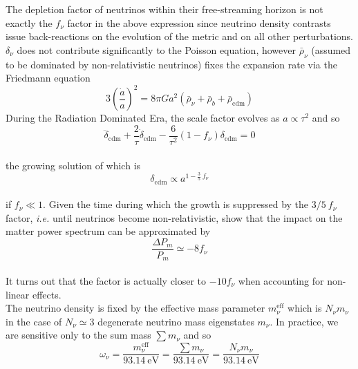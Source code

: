 The depletion factor of neutrinos within their free-streaming horizon is not exactly the $f_\nu$ factor in the above expression since neutrino density contrasts issue back-reactions on the evolution of the metric and on all other perturbations. $\delta_\nu$ does not contribute significantly to the Poisson equation, however $\bar{\rho}_\nu$ (assumed to be dominated by non-relativistic neutrinos) fixes the expansion rate via the Friedmann equation \\
\begin{equation}
3 \left( \frac{\dot{a}}{a} \right)^2 = 8 \pi G a^2 \left( \bar{\rho}_\nu + \bar{\rho}_b + \bar{\rho}_{\mathrm{cdm}} \right)
\end{equation} During the Radiation Dominated Era, the scale factor evolves as $a \propto \tau^2$ and so\\
\begin{equation}
\ddot{\delta}_{\mathrm{cdm}} + \frac{2}{\tau} \dot{\delta}_{\mathrm{cdm}} - \frac{6}{\tau^2} (1-f_\nu) \delta_{\mathrm{cdm}} = 0
\end{equation} \\ the growing solution of which is \\
\begin{equation}
\delta_{\mathrm{cdm}} \propto a^{1-\frac{3}{5}~f_\nu}
\end{equation} \\ if $f_\nu \ll 1$. Given the time during which the growth is suppressed by the $3/5~f_\nu$ factor, \textit{i.e.} until neutrinos become non-relativistic, \cite{LESGOURGUES2006} show that the impact on the matter power spectrum can be approximated by \\
\begin{equation}
\label{eq:tnu}
\frac{\Delta P_m}{P_m} \simeq - 8 f_\nu
\end{equation} \\ It turns out that the factor is actually closer to $- 10 f_{\nu}$ when accounting for non-linear effects. \\

The neutrino density is fixed by the effective mass parameter $m_\nu^{\mathrm{eff}}$ which is $N_\nu m_\nu$ in the case of $N_\nu \simeq 3$ degenerate neutrino mass eigenstates $m_\nu$. In practice, we are sensitive only to the sum mass $\sum m_\nu$ and so\\
 
\begin{equation}
\label{eq:meff_link}
\omega_\nu = \frac{m_\nu^{\mathrm{eff}}}{93.14~\mathrm{eV}} = \frac{\sum m_\nu}{93.14~\mathrm{eV}} = \frac{N_\nu m_\nu}{93.14~\mathrm{eV}}
\end{equation} \\

